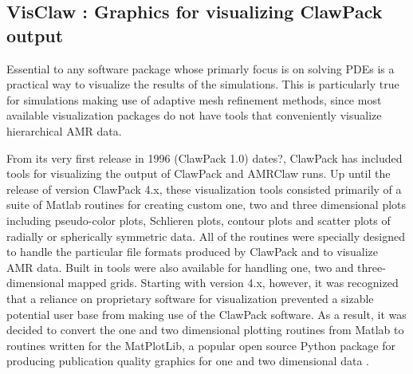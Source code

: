 %
%
%

\newcommand{\cpack}{{\sc ClawPack}\xspace}

\newcommand{\vclaw}{{\sc VisClaw}\xspace}
\newcommand{\aclaw}{{\sc AMRClaw\xspace}\xspace}
\newcommand{\gclaw}{{\sc GeoClaw\xspace}\xspace}
\newcommand{\cclaw}{{\sc Classic Claw}\xspace}
\newcommand{\pclaw}{{\sc PyClaw}\xspace}
\newcommand{\agis}{{\sc ArcGIS}\xspace}
\newcommand{\qgis}{{\sc QGIS}\xspace}

\newcommand{\mlab}{{\sc Matlab}\xspace}
\newcommand{\mplotlib}{{\sc MatPlotLib}\xspace}
\newcommand{\visit}{{\sc VisIt}\xspace}

\subsection{VisClaw : Graphics for visualizing \cpack output}
Essential to any software package whose primarly focus is on solving
PDEs is a practical way to visualize the results of the simulations.
This is particularly true for simulations making use of adaptive mesh
refinement methods, since most available visualization packages do not
have tools that conveniently visualize hierarchical AMR data.

From its very first release in 1996 (\cpack 1.0) \alert{dates?},
\cpack has included tools for visualizing the output of \cpack and
\aclaw runs.  Up until the release of version \cpack 4.x, these
visualization tools consisted primarily of a suite of \mlab routines
for creating custom one, two and three dimensional plots including
pseudo-color plots, Schlieren plots, contour plots and scatter plots
of radially or spherically symmetric data. All of the routines were
specially designed to handle the particular file formats produced by
\cpack and to visualize AMR data.  Built in tools were also available
for handling one, two and three-dimensional mapped grids.
Starting with version 4.x, however, it was recognized that a reliance
on proprietary software for visualization prevented a sizable
potential user base from making use of the \cpack software.  As a
result, it was decided to convert the one and two dimensional plotting
routines from \mlab to routines written for the \mplotlib, a popular open source
Python package for producing publication quality graphics
for one and two dimensional data \cite{Hunter:2007}.

